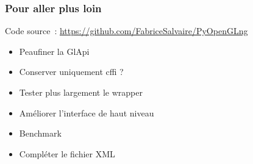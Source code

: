 \begin{frame}
  \frametitle{Pour aller plus loin}
  Code source~:
  \href{https://github.com/FabriceSalvaire/PyOpenGLng}{https://github.com/FabriceSalvaire/PyOpenGLng} \\[1em]
  \begin{itemize}
  \item Peaufiner la GlApi
  \item Conserver uniquement cffi ?
  \item Tester plus largement le wrapper
  \item Améliorer l'interface de haut niveau
  \item Benchmark
  \item Compléter le fichier XML
  \end{itemize}
  \note{
    \begin{enumerate}
    \item 
    \end{enumerate}
  }
\end{frame}

